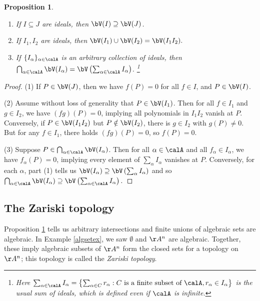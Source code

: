 \documentclass[12pt]{amsart}
\theoremstyle{plain}
\newtheorem{proposition}[theorem]{Proposition}
\begin{document}
\begin{proposition}\label{vproperties}
\begin{enumerate}
\item If $I \subseteq J$ are ideals, then $\bV(I) \supseteq \bV(J)$.
\item If $I_1, I_2$ are ideals, then $\bV(I_1) \cup \bV(I_2) = \bV(I_1 I_2).$
\item If $\{I_\alpha\}_{\alpha \in \calA}$ is an arbitrary collection of ideals, then $\bigcap_{\alpha \in \calA} \bV(I_\alpha) = \bV\left(\sum_{\alpha \in \calA} I_\alpha\right)$.
\footnote{Here $\sum_{\alpha\in\calA} I_\alpha = \left\{\sum_{\alpha \in C} r_\alpha : C \text{ is a finite subset of } \calA, r_\alpha \in I_\alpha \right\}$ is the usual sum of ideals, which is defined even if $\calA$ is infinite.}
\end{enumerate}
\end{proposition}
\begin{proof}
(1) If $P \in \bV(J)$, then we have $f(P)=0$ for all $f \in I$, and $P \in \bV(I)$.

(2) Assume without loss of generality that $P \in \bV(I_1)$.
Then for all $f \in I_1$ and $g \in I_2$, we have $(fg)(P)=0$, implying all polynomials in $I_1 I_2$ vanish at $P$.
Conversely, if $P \in \bV(I_1 I_2)$ but $P \notin \bV(I_2)$, there is $g \in I_2$ with $g(P) \ne 0$.
But for any $f \in I_1$, there holds $(fg)(P)=0$, so $f(P)=0$.

(3) Suppose $P \in \bigcap_{\alpha \in \calA} \bV(I_\alpha)$.
Then for all $\alpha \in \calA$ and all $f_\alpha \in I_\alpha$, we have $f_\alpha(P) = 0$, implying every element of $\sum_{\alpha} I_\alpha$ vanishes at $P$.
Conversely, for each $\alpha$, part (1) tells us $\bV(I_\alpha) \supseteq \bV\left(\sum_{\alpha} I_\alpha\right)$ and so 
$\bigcap_{\alpha\in\calA} \bV(I_\alpha) \supseteq \bV\left(\sum_{\alpha\in\calA} I_\alpha\right).$
\end{proof}





\subsection{The Zariski topology}
Proposition \ref{vproperties} tells us arbitrary intersections and finite unions of algebraic sets are algebraic.
In Example \ref{algsetex}, we saw $\emptyset$ and $\AA^n$ are algebraic.
Together, these imply algebraic subsets of $\AA^n$ form the closed sets for a topology on $\AA^n$; this topology is called the \emph{Zariski topology}.
\end{document}

